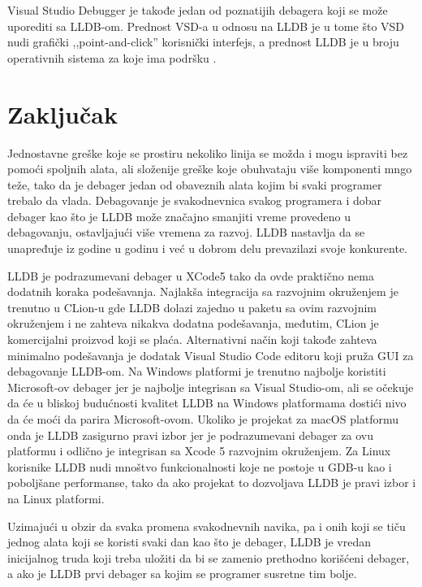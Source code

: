 \documentclass[a4paper]{article}
\begin{document}
Visual Studio Debugger je takođe jedan od poznatijih debagera koji se može uporediti sa LLDB-om. Prednost VSD-a u odnosu na LLDB je u tome što VSD nudi grafički ,,point-and-click'' korisnički interfejs, a prednost LLDB je u broju operativnih sistema za koje ima podršku \cite{vsd}.
\section{Zaključak}
\label{sec:zakljucak}

Jednostavne greške koje se prostiru nekoliko linija se možda i mogu ispraviti bez pomoći spoljnih alata, ali složenije greške koje obuhvataju više komponenti mngo teže, tako da je debager jedan od obaveznih alata kojim bi svaki programer trebalo da vlada.
Debagovanje je svakodnevnica svakog programera i dobar debager kao što je LLDB može značajno smanjiti vreme provedeno u debagovanju, ostavljajući više vremena za razvoj. LLDB nastavlja da se unapređuje iz godine u godinu i već u dobrom delu prevazilazi svoje konkurente.

LLDB je podrazumevani debager u XCode5 tako da ovde praktično nema dodatnih koraka podešavanja. Najlakša integracija sa razvojnim okruženjem je trenutno u CLion-u gde LLDB dolazi zajedno u paketu sa ovim razvojnim okruženjem i ne zahteva nikakva dodatna podešavanja, međutim, CLion je komercijalni proizvod koji se plaća. Alternativni način koji takođe zahteva minimalno podešavanja je dodatak Visual Studio Code editoru koji pruža GUI za debagovanje LLDB-om. Na Windows platformi je trenutno najbolje koristiti Microsoft-ov debager jer je najbolje integrisan sa Visual Studio-om, ali se očekuje da će u bliskoj budućnosti kvalitet LLDB na Windows platformama dostići nivo da će moći da parira Microsoft-ovom. Ukoliko je projekat za macOS platformu onda je LLDB zasigurno pravi izbor jer je podrazumevani debager za ovu platformu i odlično je integrisan sa Xcode 5 razvojnim okruženjem. Za Linux korisnike LLDB nudi mnoštvo funkcionalnosti koje ne postoje u GDB-u kao i poboljšane performanse, tako da ako projekat to dozvoljava LLDB je pravi izbor i na Linux platformi.
 
Uzimajući u obzir da svaka promena svakodnevnih navika, pa i onih koji se tiču jednog alata koji se koristi svaki dan kao što je debager, LLDB je vredan inicijalnog truda koji treba uložiti da bi se zamenio prethodno korišćeni debager, a ako je LLDB prvi debager sa kojim se programer susretne tim bolje.
\appendix
 

\end{document}
